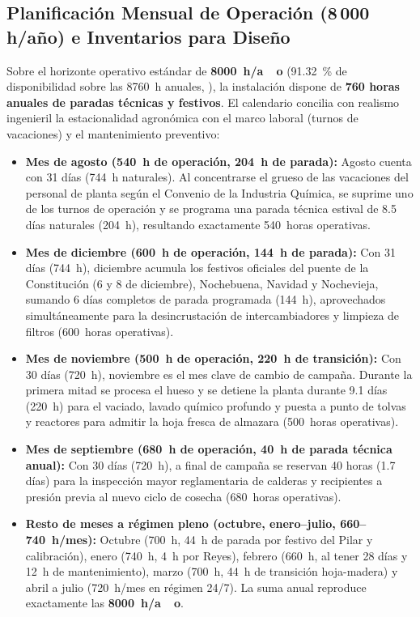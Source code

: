 \documentclass{report}
\begin{document}
\subsection{Planificación Mensual de Operación (8\,000 h/año) e Inventarios para Diseño}
Sobre el horizonte operativo estándar de \textbf{\SI{8000}{\hour/ao}} (\SI{91.32}{\percent} de disponibilidad sobre las \SI{8760}{\hour} anuales, \textcite[Tabla~6]{Jafari-Gohargan2026}), la instalación dispone de \textbf{\num{760} horas anuales de paradas técnicas y festivos}. El calendario concilia con realismo ingenieril la estacionalidad agronómica con el marco laboral (turnos de vacaciones) y el mantenimiento preventivo:
\begin{itemize}
    \item \textbf{Mes de agosto (540~h de operación, 204~h de parada):} Agosto cuenta con 31 días (744~h naturales). Al concentrarse el grueso de las vacaciones del personal de planta según el Convenio de la Industria Química, se suprime uno de los turnos de operación y se programa una parada técnica estival de 8.5 días naturales (204~h), resultando exactamente 540~horas operativas.
    \item \textbf{Mes de diciembre (600~h de operación, 144~h de parada):} Con 31 días (744~h), diciembre acumula los festivos oficiales del puente de la Constitución (6 y 8 de diciembre), Nochebuena, Navidad y Nochevieja, sumando 6 días completos de parada programada (144~h), aprovechados simultáneamente para la desincrustación de intercambiadores y limpieza de filtros (600~horas operativas).
    \item \textbf{Mes de noviembre (500~h de operación, 220~h de transición):} Con 30 días (720~h), noviembre es el mes clave de cambio de campaña. Durante la primera mitad se procesa el hueso y se detiene la planta durante 9.1 días (220~h) para el vaciado, lavado químico profundo y puesta a punto de tolvas y reactores para admitir la hoja fresca de almazara (500~horas operativas).
    \item \textbf{Mes de septiembre (680~h de operación, 40~h de parada técnica anual):} Con 30 días (720~h), a final de campaña se reservan 40 horas (1.7 días) para la inspección mayor reglamentaria de calderas y recipientes a presión previa al nuevo ciclo de cosecha (680~horas operativas).
    \item \textbf{Resto de meses a régimen pleno (octubre, enero--julio, 660--740~h/mes):} Octubre (700~h, 44~h de parada por festivo del Pilar y calibración), enero (740~h, 4~h por Reyes), febrero (660~h, al tener 28 días y 12~h de mantenimiento), marzo (700~h, 44~h de transición hoja-madera) y abril a julio (720~h/mes en régimen 24/7). La suma anual reproduce exactamente las \textbf{\SI{8000}{\hour/ao}}.
\end{itemize}
\end{document}

